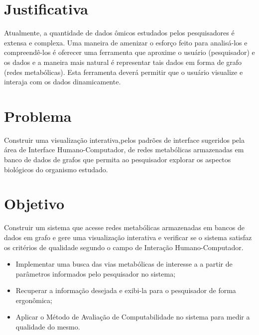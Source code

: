 
\section*{Justificativa}
\indent Atualmente, a quantidade de dados ômicos estudados pelos pesquisadores é extensa e complexa. Uma maneira de amenizar o esforço feito para analisá-los e compreendê-los é oferecer uma ferramenta que aproxime o usuário (pesquisador) e os dados e a maneira mais natural é representar tais dados em forma de grafo (redes metabólicas). Esta ferramenta deverá permitir que o usuário visualize e interaja com os dados dinamicamente.

\section*{Problema}
\indent Construir uma visualização interativa,pelos padrões de interface sugeridos pela área de Interface Humano-Computador, de redes metabólicas armazenadas em banco de dados de grafos que permita ao pesquisador explorar os aspectos biológicos do organismo estudado.

\section*{Objetivo}
\indent Construir um sistema que acesse redes metabólicas armazenadas em bancos de dados em grafo e gere uma visualização interativa e verificar se o sistema satisfaz os critérios de qualidade segundo o campo de Interação Humano-Computador.
\begin{itemize}
 \item Implementar uma busca das vias metabólicas de interesse a a partir de parâmetros informados pelo pesquisador no sistema;
 \item Recuperar a informação desejada e exibi-la para o pesquisador de forma ergonômica;
 \item Aplicar o Método de Avaliação de Computabilidade no sistema para medir a qualidade do mesmo.
\end{itemize}

